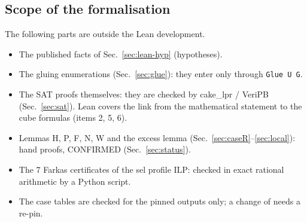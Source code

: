 \subsection{Scope of the formalisation}
The following parts are outside the Lean development.\label{sec:lean-notformal}
\begin{itemize}
\item The published facts of Sec.~\ref{sec:lean-hyp} (hypotheses).
\item The gluing enumerations (Sec.~\ref{sec:glue}): they enter only through \texttt{Glue U G}.
\item The SAT proofs themselves: they are checked by cake\_lpr / VeriPB (Sec.~\ref{sec:sat}). Lean covers the link from the
  mathematical statement to the cube formulas (items 2, 5, 6).
\item Lemmas H, P, F, N, W and the excess lemma (Sec.~\ref{sec:caseR}--\ref{sec:local}): hand proofs, CONFIRMED (Sec.~\ref{sec:status}).
\item The 7 Farkas certificates of the sel profile ILP: checked in exact rational arithmetic by a Python script.
\item The case tables are checked for the pinned outputs only; a change of  needs a re-pin.
\end{itemize}
